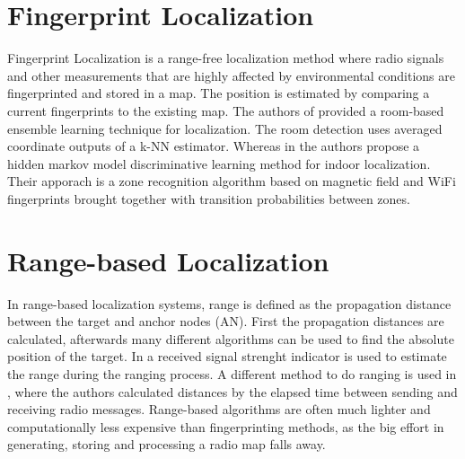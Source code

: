 \section{Fingerprint Localization}
Fingerprint Localization is a range-free localization method where radio signals and other measurements that are highly affected by environmental conditions are fingerprinted and stored in a map. The position is estimated by comparing a current fingerprints to the existing map. The authors of \cite{Taniuchi} provided a room-based ensemble learning technique for localization. The room detection uses averaged coordinate outputs of a k-NN estimator. Whereas in \cite{Carrera2} the authors propose a hidden markov model discriminative learning method for indoor localization. Their apporach is a zone recognition algorithm based on magnetic field and WiFi fingerprints brought together with transition probabilities between zones.

\section{Range-based Localization}
In range-based localization systems, range is defined as the propagation distance between the target and anchor nodes (AN). First the propagation distances are calculated, afterwards many different algorithms can be used to find the absolute position of the target. In \cite{Horus} a received signal strenght indicator is used to estimate the range during the ranging process. A different method to do ranging is used in \cite{IEEE}, where the authors calculated distances by the elapsed time between sending and receiving radio messages. Range-based algorithms are often much lighter and computationally less expensive than fingerprinting methods, as the big effort in generating, storing and processing a radio map falls away. 


